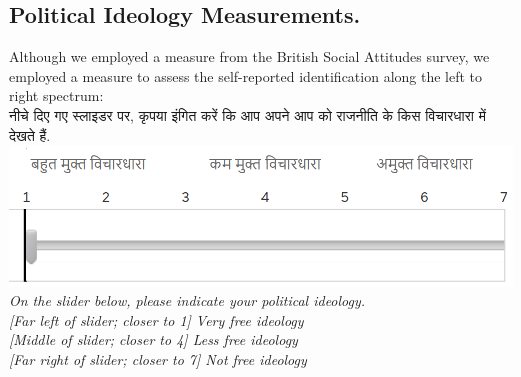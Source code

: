 \documentclass[empirical, authordate]{jote-new-article}
\begin{document}
\clearpage
\subsection{ Political Ideology Measurements. }

Although we employed a measure from the British Social Attitudes survey, we employed a measure to assess the self-reported identification along the left to right spectrum: \\
नीचे दिए गए स्लाइडर पर, कृपया इंगित करें कि आप अपने आप को राजनीति के किस विचारधारा में देखते हैं.\\

\includegraphics[width=\linewidth]{media/supplement/images-2.jpeg}
\emph{On the slider below, please indicate your political ideology.}\\
\emph{[Far left of slider; closer to 1] Very free ideology}\\
\emph{[Middle of slider; closer to 4] Less free ideology}\\
\emph{[Far right of slider; closer to 7] Not free ideology }
\end{document}
